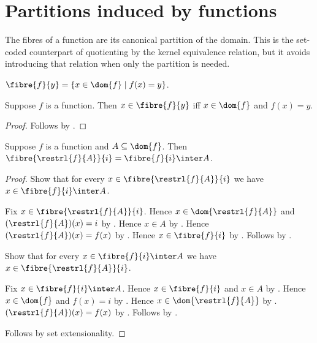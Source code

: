 \section{Partitions induced by functions}






The fibres of a function are its canonical partition of the domain.  This is
the set-coded counterpart of quotienting by the kernel equivalence relation,
but it avoids introducing that relation when only the partition is needed.

\begin{definition}\label{function_fibre}
    $\fibre{f}{y}=\{x\in\dom{f}\mid f(x)=y\}$.
\end{definition}

\begin{proposition}\label{function_fibre_iff}
    Suppose $f$ is a function.
    Then $x\in\fibre{f}{y}$ iff $x\in\dom{f}$ and $f(x)=y$.
\end{proposition}
\begin{proof}
    Follows by .
\end{proof}

\begin{proposition}\label{function_fibre_restriction}
    Suppose $f$ is a function and $A\subseteq\dom{f}$.
    Then $\fibre{\restrl{f}{A}}{i}=\fibre{f}{i}\inter A$.
\end{proposition}
\begin{proof}
    Show that for every $x\in\fibre{\restrl{f}{A}}{i}$
        we have $x\in\fibre{f}{i}\inter A$.
    \begin{subproof}
        Fix $x\in\fibre{\restrl{f}{A}}{i}$.
        Hence $x\in\dom{\restrl{f}{A}}$ and
            $(\restrl{f}{A})(x)=i$ by .
        Hence $x\in A$ by
            .
        Hence $(\restrl{f}{A})(x)=f(x)$
            by .
        Hence $x\in\fibre{f}{i}$ by .
        Follows by .
    \end{subproof}
    Show that for every $x\in\fibre{f}{i}\inter A$
        we have $x\in\fibre{\restrl{f}{A}}{i}$.
    \begin{subproof}
        Fix $x\in\fibre{f}{i}\inter A$.
        Hence $x\in\fibre{f}{i}$ and $x\in A$ by .
        Hence $x\in\dom{f}$ and $f(x)=i$
            by .
        Hence $x\in\dom{\restrl{f}{A}}$
            by .
        $(\restrl{f}{A})(x)=f(x)$
            by .
        Follows by .
    \end{subproof}
    Follows by set extensionality.
\end{proof}

